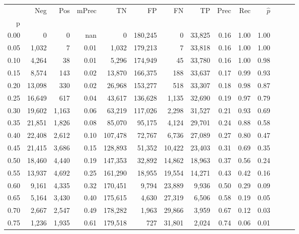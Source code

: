 \begin{tabular}{rrrrrrrrrrrrrr}
\toprule
{} &     Neg &    Pos & mPrec &       TN &       FP &      FN &      TP &  Prec &   Rec & $\hat{p}$ \\
p    &         &        &       &          &          &         &         &       &       &           \\
\midrule
0.00 &       0 &      0 &   nan &        0 &  180,245 &       0 &  33,825 &  0.16 &  1.00 &      1.00 \\
0.05 &   1,032 &      7 &  0.01 &    1,032 &  179,213 &       7 &  33,818 &  0.16 &  1.00 &      1.00 \\
0.10 &   4,264 &     38 &  0.01 &    5,296 &  174,949 &      45 &  33,780 &  0.16 &  1.00 &      0.98 \\
0.15 &   8,574 &    143 &  0.02 &   13,870 &  166,375 &     188 &  33,637 &  0.17 &  0.99 &      0.93 \\
0.20 &  13,098 &    330 &  0.02 &   26,968 &  153,277 &     518 &  33,307 &  0.18 &  0.98 &      0.87 \\
0.25 &  16,649 &    617 &  0.04 &   43,617 &  136,628 &   1,135 &  32,690 &  0.19 &  0.97 &      0.79 \\
0.30 &  19,602 &  1,163 &  0.06 &   63,219 &  117,026 &   2,298 &  31,527 &  0.21 &  0.93 &      0.69 \\
0.35 &  21,851 &  1,826 &  0.08 &   85,070 &   95,175 &   4,124 &  29,701 &  0.24 &  0.88 &      0.58 \\
0.40 &  22,408 &  2,612 &  0.10 &  107,478 &   72,767 &   6,736 &  27,089 &  0.27 &  0.80 &      0.47 \\
0.45 &  21,415 &  3,686 &  0.15 &  128,893 &   51,352 &  10,422 &  23,403 &  0.31 &  0.69 &      0.35 \\
0.50 &  18,460 &  4,440 &  0.19 &  147,353 &   32,892 &  14,862 &  18,963 &  0.37 &  0.56 &      0.24 \\
0.55 &  13,937 &  4,692 &  0.25 &  161,290 &   18,955 &  19,554 &  14,271 &  0.43 &  0.42 &      0.16 \\
0.60 &   9,161 &  4,335 &  0.32 &  170,451 &    9,794 &  23,889 &   9,936 &  0.50 &  0.29 &      0.09 \\
0.65 &   5,164 &  3,430 &  0.40 &  175,615 &    4,630 &  27,319 &   6,506 &  0.58 &  0.19 &      0.05 \\
0.70 &   2,667 &  2,547 &  0.49 &  178,282 &    1,963 &  29,866 &   3,959 &  0.67 &  0.12 &      0.03 \\
0.75 &   1,236 &  1,935 &  0.61 &  179,518 &      727 &  31,801 &   2,024 &  0.74 &  0.06 &      0.01 \\

\end{tabular}
